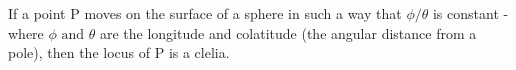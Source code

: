 If a point P moves on the surface of a sphere in such a way that 
$ \phi / \theta $ is constant - where $ \phi \text{   and } \theta $ are
the longitude and colatitude (the angular distance from a pole), then
the locus of P is a clelia.